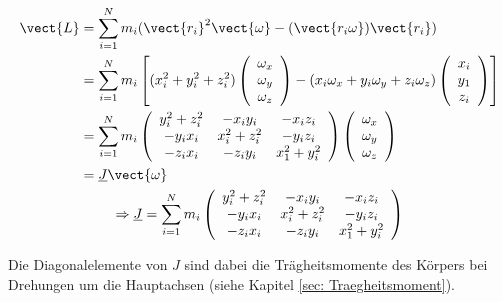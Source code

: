 \begin{gather}
    \begin{aligned}
    \vect{L}&=\sum_{i=1}^{N} m_i (\vect{r_i}^2\vect{\omega}-(\vect{r_i\omega})\vect{r_i})\\
            &=\sum_{i=1}^{N} m_i\left[(x_i^2+y_i^2+z_i^2)
              \left(\begin{array}{c} \omega_x \\ \omega_y \\ \omega_z \end{array}\right)
              - (x_i\omega_x+y_i\omega_y+z_i\omega_z)
              \left(\begin{array}{c} x_i \\ y_1 \\ z_i \end{array}\right)\right]\\
            &=\sum_{i=1}^{N} m_i
              \left(\begin{array}{ccc} y_i^2+z_i^2 & -x_iy_i & -x_iz_i \\ -y_ix_i & x_i^2+z_i^2 & -y_iz_i \\ -z_ix_i & -z_iy_i & x_1^2+y_i^2 \end{array}\right) 
              \left(\begin{array}{c} \omega_x \\ \omega_y \\ \omega_z \end{array}\right) \\
            &=\underline{J}\vect{\omega}
    \end{aligned} \\
    \Rightarrow \underline{J} = \sum_{i=1}^{N} m_i
                                \left(\begin{array}{ccc} y_i^2+z_i^2 & -x_iy_i & -x_iz_i \\ -y_ix_i & x_i^2+z_i^2 & -y_iz_i \\ -z_ix_i & -z_iy_i & x_1^2+y_i^2 \end{array}\right)
\end{gather}

Die Diagonalelemente von $J$ sind dabei die Trägheitsmomente des Körpers bei Drehungen um die Hauptachsen (siehe Kapitel \ref{sec: Traegheitsmoment}).